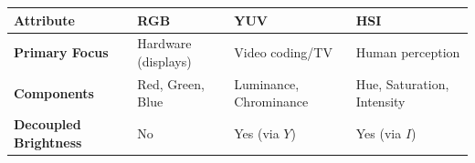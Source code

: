 \documentclass[12pt,a4paper]{article}
\renewcommand{\arraystretch}{1.45}
\begin{document}
\begin{tcolorbox}[tikzbox, title={Comparison of Color Models}]
\centering
{\renewcommand{\arraystretch}{1.55}%
\begin{tabularx}{\linewidth}{|>{\bfseries}B{3.2cm}|Y|Y|Y|}
\hline
Attribute & RGB & YUV & HSI \\
\hline
Primary Focus & Hardware (displays) & Video coding/TV & Human perception \\
\hline
Components & Red, Green, Blue & Luminance, Chrominance & Hue, Saturation, Intensity \\
\hline
Decoupled Brightness & No & Yes (via $Y$) & Yes (via $I$) \\
\hline
\end{tabularx}}
\end{tcolorbox}
\end{document}
